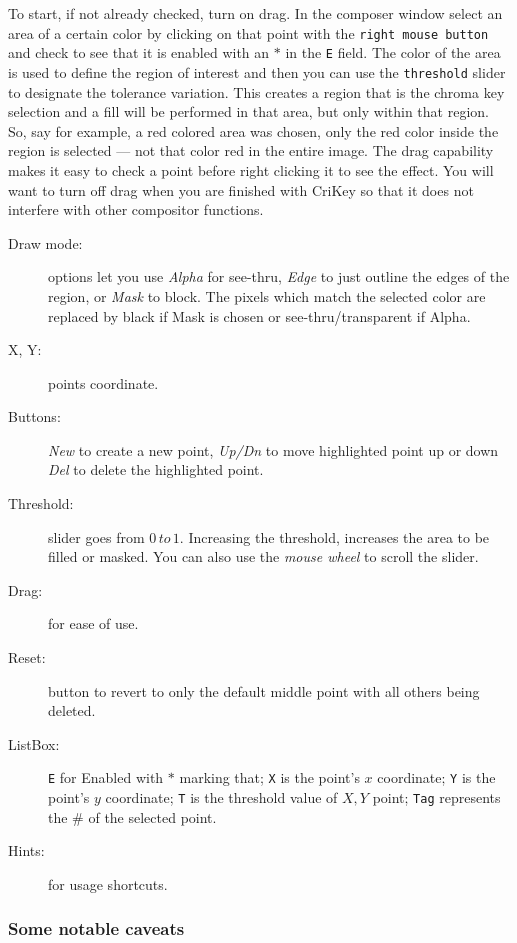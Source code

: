 To start, if not already checked, turn on drag. In the composer window select an area of a certain color by clicking on that point with the \texttt{right mouse button} and check to see that it is enabled with an $*$ in the \texttt{E} field. The color of the area is used to define the region of interest and then you can use the \texttt{threshold} slider to designate the tolerance variation. This creates a region that is the chroma key selection and a fill will be performed in that area, but only within that region. So, say for example, a red colored area was chosen, only the red color inside the region is selected --- not that color red in the entire image. The drag capability makes it easy to check a point before right clicking it to see the effect. You will want to turn off drag when you are finished with CriKey so that it does not interfere with other compositor functions.

\begin{description}
    \item[Draw mode:] options let you use \textit{Alpha} for see-thru, \textit{Edge} to just outline the edges of the region, or \textit{Mask} to block. The pixels which match the selected color are replaced by black if Mask is chosen or see-thru/transparent if Alpha.
    \item[X, Y:] points coordinate.
    \item[Buttons:] \textit{New} to create a new point, \textit{Up/Dn} to move highlighted point up or down \textit{Del} to delete the highlighted point.
    \item[Threshold:] slider goes from $0\, to\, 1$. Increasing the threshold, increases the area to be filled or masked. You can also use the \textit{mouse wheel} to scroll the slider.
    \item[Drag:] for ease of use.
    \item[Reset:] button to revert to only the default middle point with all others being deleted.
    \item[ListBox:] \texttt{E} for Enabled with $*$ marking that; \texttt{X} is the point’s $x$ coordinate; \texttt{Y} is the point’s $y$ coordinate; \texttt{T} is the threshold value of $X,Y$ point; \texttt{Tag} represents the \# of the selected 
    point.
    \item[Hints:] for usage shortcuts.
\end{description}

\subsubsection*{Some notable caveats}
\label{ssub:some_notable_caveats}

